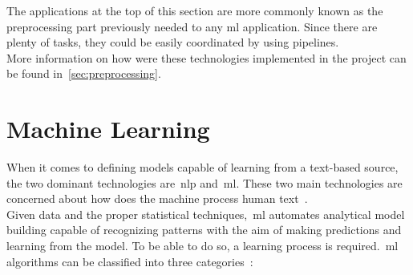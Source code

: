 The applications at the top of this section are more commonly known as the preprocessing part previously needed to any \ac{ml} application. Since there are plenty of tasks, they could be easily coordinated by using pipelines.\\ 
More information on how were these technologies implemented in the project can be found in~\cref{sec:preprocessing}.

\section{Machine Learning}
When it comes to defining models capable of learning from a text-based source, the two dominant technologies are~\acl{nlp} and~\acl{ml}. These two main technologies are concerned about how does the machine process human text~\cite{tfidf}. \\
Given data and the proper statistical techniques,~\ac{ml} automates analytical model building capable of recognizing patterns with the aim of making predictions and learning from the model. To be able to do so, a learning process is required.~\ac{ml} algorithms can be classified into three categories~\cite{dataclust}:
